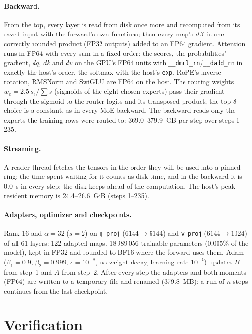 \documentclass[11pt]{article}
\begin{document}
\paragraph{Backward.} From the top, every layer is read from disk once more and recomputed from its saved input with the
forward's own functions; then every map's $dX$ is one correctly rounded product (FP32 outputs) added to an FP64 gradient.
Attention runs in FP64 with every sum in a fixed order: the scores, the probabilities' gradient, $dq$, $dk$ and $dv$ on the
GPU's FP64 units with \texttt{\_\_dmul\_rn}/\texttt{\_\_dadd\_rn} in exactly the host's order, the softmax with the host's
\texttt{exp}. RoPE's inverse rotation, RMSNorm and SwiGLU are FP64 on the host. The routing weights $w_e = 2.5\,s_e/\sum s$
(sigmoids of the eight chosen experts) pass their gradient through the sigmoid to the router logits and its transposed product;
the top-8 choice is a constant, as in every MoE backward. The backward reads only the experts the training rows were routed
to: 369.0--379.9~GB per step over steps 1--235.

\paragraph{Streaming.} A reader thread fetches the tensors in the order they will be used into a pinned ring; the time spent
waiting for it counts as disk time, and in the backward it is 0.0~s in every step: the disk keeps ahead of the computation.
The host's peak resident memory is 24.4--26.6~GiB (steps 1--235).

\paragraph{Adapters, optimizer and checkpoints.} Rank 16 and $\alpha=32$ ($s=2$) on \texttt{q\_proj} ($6144\to6144$) and
\texttt{v\_proj} ($6144\to1024$) of all 61 layers: 122 adapted maps, 18\,989\,056 trainable parameters (0.005\% of the
model), kept in FP32 and rounded to BF16 where the forward uses them. Adam ($\beta_1=0.9$, $\beta_2=0.999$,
$\epsilon=10^{-8}$, no weight decay, learning rate $10^{-4}$) updates $B$ from step~1 and $A$ from step~2. After every step the
adapters and both moments (FP64) are written to a temporary file and renamed (379.8~MB); a run of $n$ steps continues from the
last checkpoint.

\section{Verification}\label{sec:verify}
\end{document}
